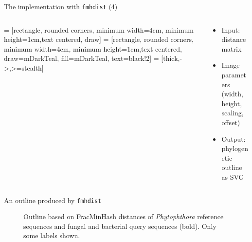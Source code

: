 \documentclass[aspectratio=169]{beamer}
\begin{document}
\begin{frame}{The implementation with \texttt{fmhdist} (4)}
    \begin{columns}
        \begin{column}{0.5\textwidth}
             = [rectangle, rounded corners, minimum width=4cm, minimum height=1cm,text centered, draw]
             = [rectangle, rounded corners, minimum width=4cm, minimum height=1cm,text centered, draw=mDarkTeal, fill=mDarkTeal, text=black!2]
             = [thick,->,>=stealth]
        \end{column}
        \begin{column}{0.5\textwidth}
            \begin{itemize}
                \item Input: distance matrix
                \item Image parameters (width, height, scaling, offset)
                \item Output: phylogenetic outline as SVG
            \end{itemize}
        \end{column}
        \end{columns}   
\end{frame}

\begin{frame}{An outline produced by \texttt{fmhdist}} 
    \begin{figure}
        \fontsize{7}{10}\selectfont
        
        \caption{Outline based on FracMinHash distances of \textit{Phytophthora}
        reference sequences and fungal and bacterial query sequences (bold).
        Only some labels shown.}
        \label{fig:outlineMash}
    \end{figure}
\end{frame}
\end{document}
